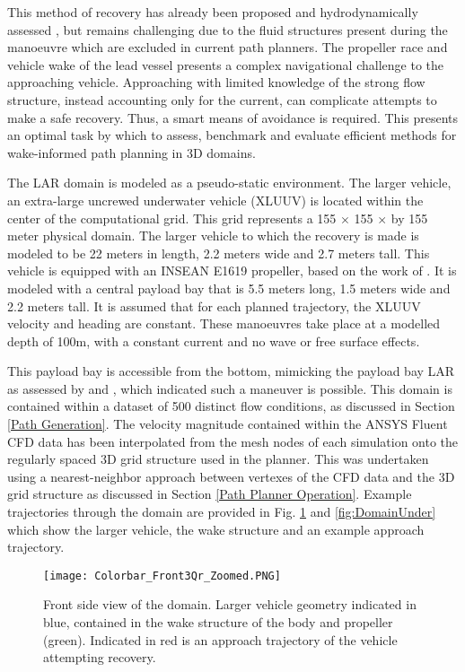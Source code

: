 \documentclass[final,5p,times,twocolumn]{elsarticle}
\begin{document}
This method of recovery has already been proposed and hydrodynamically assessed \cite{IEEE, SUBSTEC}, but remains challenging due to the fluid structures present during the manoeuvre which are excluded in current path planners. The propeller race and vehicle wake of the lead vessel presents a complex navigational challenge to the approaching vehicle. Approaching with limited knowledge of the strong flow structure, instead accounting only for the current, can complicate attempts to make a safe recovery. Thus, a smart means of avoidance is required. This presents an optimal task by which to assess, benchmark and evaluate efficient methods for wake-informed path planning in 3D domains.

The LAR domain is modeled as a pseudo-static environment. The larger vehicle, an extra-large uncrewed underwater vehicle (XLUUV) is located within the center of the computational grid. This grid represents a 155 $\times$ 155 $\times$ by 155 meter physical domain. The larger vehicle to which the recovery is made is modeled to be 22 meters in length, 2.2 meters wide and 2.7 meters tall. This vehicle is equipped with an INSEAN E1619 propeller, based on the work of \cite{IEEE}. It is modeled with a central payload bay that is 5.5 meters long, 1.5 meters wide and 2.2 meters tall. It is assumed that for each planned trajectory, the XLUUV velocity and heading are constant. These manoeuvres take place at a modelled depth of 100m, with a constant current and no wave or free surface effects. 

This payload bay is accessible from the bottom, mimicking the payload bay LAR as assessed by \cite{IEEE} and \cite{SUBSTEC}, which indicated such a maneuver is possible. This domain is contained within a dataset of 500 distinct flow conditions, as discussed in Section \ref{Path Generation}. The velocity magnitude contained within the ANSYS Fluent CFD data has been interpolated from the mesh nodes of each simulation onto the regularly spaced 3D grid structure used in the planner. This was undertaken using a nearest-neighbor approach between vertexes of the CFD data and the 3D grid structure as discussed in Section \ref{Path Planner Operation}. Example trajectories through the domain are provided in Fig. \ref{fig:DomainSide} and \ref{fig:DomainUnder} which show the larger vehicle, the wake structure and an example approach trajectory.


\begin{figure}[!htbp]
    \centering
    \texttt{[image: Colorbar\_Front3Qr\_Zoomed.PNG]}
    \caption{Front side view of the domain. Larger vehicle geometry indicated in blue, contained in the wake structure of the body and propeller (green). Indicated in red is an approach trajectory of the vehicle attempting recovery.}
    \label{fig:DomainSide}
\end{figure}
\end{document}
